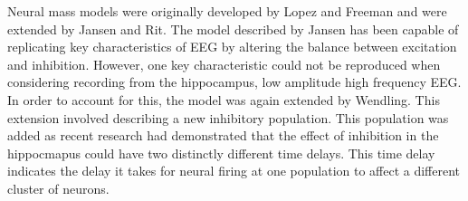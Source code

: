 %
%
%



Neural mass models were originally developed by Lopez and Freeman and were extended by Jansen and Rit. The model described by Jansen has been capable of replicating key characteristics of EEG by altering the balance between excitation and inhibition. However, one key characteristic could not be reproduced when considering recording from the hippocampus, low amplitude high frequency EEG. In order to account for this, the model was again extended by Wendling. This extension involved describing a new inhibitory population. This population was added as recent research had demonstrated that the effect of inhibition in the hippocmapus could have two distinctly different time delays. This time delay indicates the delay it takes for neural firing at one population to affect a different cluster of neurons.  

